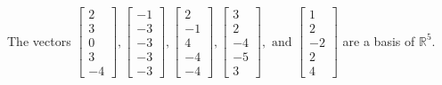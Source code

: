 \begin{exercise}
\begin{exerciseStatement}
  \end{exerciseStatement}
  \begin{exerciseAnswer}
   The vectors \(\left[\begin{array}{r}
2 \\
3 \\
0 \\
3 \\
-4
\end{array}\right] , \left[\begin{array}{r}
-1 \\
-3 \\
-3 \\
-3 \\
-3
\end{array}\right] , \left[\begin{array}{r}
2 \\
-1 \\
4 \\
-4 \\
-4
\end{array}\right] , \left[\begin{array}{r}
3 \\
2 \\
-4 \\
-5 \\
3
\end{array}\right] , \text{ and } \left[\begin{array}{r}
1 \\
2 \\
-2 \\
2 \\
4
\end{array}\right]\) 
  	 are  a basis of \(\mathbb{R}^5\).
  


  \end{exerciseAnswer}
\end{exercise}
